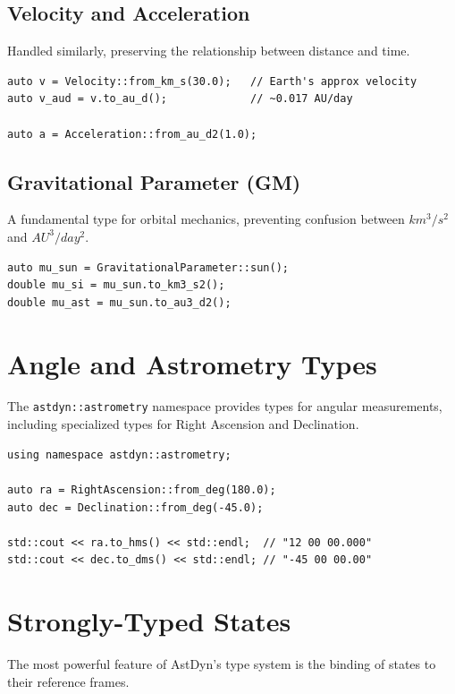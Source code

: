\subsection{Velocity and Acceleration}
Handled similarly, preserving the relationship between distance and time.

\begin{lstlisting}[style=cpp, caption={Using Velocity and Acceleration}]
auto v = Velocity::from_km_s(30.0);   // Earth's approx velocity
auto v_aud = v.to_au_d();             // ~0.017 AU/day

auto a = Acceleration::from_au_d2(1.0); 
\end{lstlisting}

\subsection{Gravitational Parameter (GM)}
A fundamental type for orbital mechanics, preventing confusion between $km^3/s^2$ and $AU^3/day^2$.

\begin{lstlisting}[style=cpp, caption={Using GravitationalParameter}]
auto mu_sun = GravitationalParameter::sun();
double mu_si = mu_sun.to_km3_s2();
double mu_ast = mu_sun.to_au3_d2();
\end{lstlisting}

\section{Angle and Astrometry Types}

The \texttt{astdyn::astrometry} namespace provides types for angular measurements, including specialized types for Right Ascension and Declination.

\begin{lstlisting}[style=cpp, caption={Astrometric angle types}]
using namespace astdyn::astrometry;

auto ra = RightAscension::from_deg(180.0);
auto dec = Declination::from_deg(-45.0);

std::cout << ra.to_hms() << std::endl;  // "12 00 00.000"
std::cout << dec.to_dms() << std::endl; // "-45 00 00.00"
\end{lstlisting}

\section{Strongly-Typed States}

The most powerful feature of AstDyn's type system is the binding of states to their reference frames.

